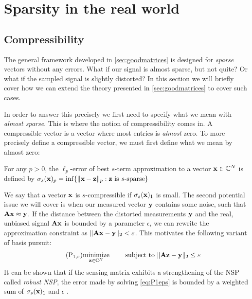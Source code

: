 






\section{Sparsity in the real world}
\subsection{Compressibility}
The general framework developed in \cref{sec:goodmatrices} is designed for \textit{sparse} vectors without any errors. What if our signal is almost sparse, but not quite? Or what if the sampled signal is slightly distorted? In this section we will briefly cover how we can extend the theory presented in \cref{sec:goodmatrices} to cover such cases.

In order to answer this precisely we first need to specify what we mean with \textit{almost sparse}. This is where the notion of compressibility comes in. A compressible vector is a vector where most entries is \textit{almost} zero. To more precisely define a compressible vector, we must first define what we mean by almost zero:
\begin{definition} \label{def:compressibility}
	For any $ p > 0 $, the $ \ell_{p} $-error of best $ s $-term approximation to a vector $ \mathbf{x} \in \mathbb{C}^{N} $ is defined by
	\(
		\sigma_{s}(\mathbf{x})_{p} = \inf \{\lVert\mathbf{x} - \mathbf{z}\rVert_{p} : \mathbf{z} \text{ is } s\text{-sparse}\}
	\)
\end{definition}

We say that a vector $ \mathbf{x} $ is $ s $-compressible if $ \sigma_{s}(\mathbf{x})_{1} $ is small. The second potential issue we will cover is when our measured vector $ \mathbf{y} $ contains some noise, such that $ \mathbf{A}\mathbf{x} \approx \mathbf{y} $. If the distance between the distorted measurements $ \mathbf{y} $ and the real, unbiased signal $ \mathbf{A}\mathbf{x} $ is bounded by a parameter $ \epsilon $, we can rewrite the approximation constraint as $ \lVert\mathbf{A}\mathbf{x} - \mathbf{y}\rVert_{2} < \varepsilon $. This motivates the following variant of basis pursuit:
\begin{equation}
	\tag{P$_{1, \epsilon}$}
	\label{eq:P1eps}
	\minimize{\z\in\Cx^{N}} \quad\subjectto \norm{\A\z - \y}_{2} \leq \epsilon
\end{equation}
It can be shown that if the sensing matrix exhibits a strengthening of the NSP called \textit{robust NSP}, the error made by solving \eqref{eq:P1eps} is bounded by a weighted sum of $ \sigma_{s}(\mathbf{x})_{1} $ and $ \epsilon $ \cite[Section~4.3]{foucart13intro}.



